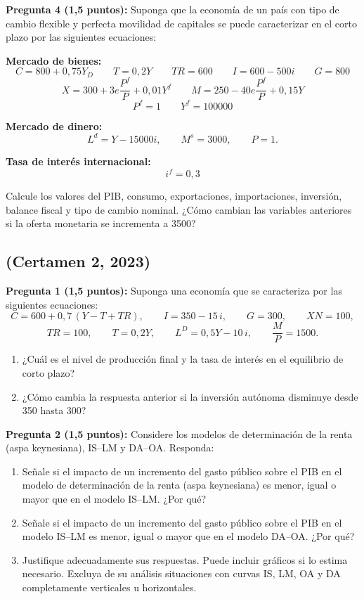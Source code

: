 \documentclass[11pt,addpoints]{article}
\begin{document}
\vspace{0.4cm}

\textbf{Pregunta 4 (1{,}5 puntos):}  
Suponga que la economía de un país con tipo de cambio flexible y perfecta movilidad de capitales se puede caracterizar en el corto plazo por las siguientes ecuaciones:

\textbf{Mercado de bienes:}
\[
C = 800 + 0{,}75Y_D \qquad T = 0{,}2Y \qquad TR = 600 \qquad I = 600 - 500i \qquad G = 800
\]
\[
X = 300 + 3e\frac{P^f}{P} + 0{,}01Y^f \qquad M = 250 - 40e\frac{P^f}{P} + 0{,}15Y
\]
\[
P^f = 1 \qquad Y^f = 100000
\]

\textbf{Mercado de dinero:}
\[
L^d = Y - 15000i, \qquad M^s = 3000, \qquad P = 1.
\]

\textbf{Tasa de interés internacional:}
\[
i^f = 0{,}3
\]

Calcule los valores del PIB, consumo, exportaciones, importaciones, inversión, balance fiscal y tipo de cambio nominal.  
¿Cómo cambian las variables anteriores si la oferta monetaria se incrementa a 3500?

\newpage
\vspace*{0.1cm}

\subsection*{(Certamen 2, 2023)}

\textbf{Pregunta 1 (1{,}5 puntos):}  
Suponga una economía que se caracteriza por las siguientes ecuaciones:
\[
C = 600 + 0{,}7\,(Y - T + TR), \qquad
I = 350 - 15\,i, \qquad
G = 300, \qquad
XN = 100,
\]
\[
TR = 100, \qquad
T = 0{,}2Y, \qquad
L^D = 0{,}5Y - 10\,i, \qquad
\frac{M}{P} = 1500.
\]
\begin{enumerate}[label=\alph*)]
    \item ¿Cuál es el nivel de producción final y la tasa de interés en el equilibrio de corto plazo?  
    \item ¿Cómo cambia la respuesta anterior si la inversión autónoma disminuye desde 350 hasta 300?
\end{enumerate}

\vspace{0.4cm}

\textbf{Pregunta 2 (1{,}5 puntos):}  
Considere los modelos de determinación de la renta (aspa keynesiana), IS--LM y DA--OA. Responda:

\begin{enumerate}[label=\alph*)]
    \item Señale si el impacto de un incremento del gasto público sobre el PIB en el modelo de determinación de la renta (aspa keynesiana) es menor, igual o mayor que en el modelo IS--LM. ¿Por qué?
    \item Señale si el impacto de un incremento del gasto público sobre el PIB en el modelo IS--LM es menor, igual o mayor que en el modelo DA--OA. ¿Por qué?
    \item Justifique adecuadamente sus respuestas. Puede incluir gráficos si lo estima necesario. Excluya de su análisis situaciones con curvas IS, LM, OA y DA completamente verticales u horizontales.
\end{enumerate}
\end{document}
